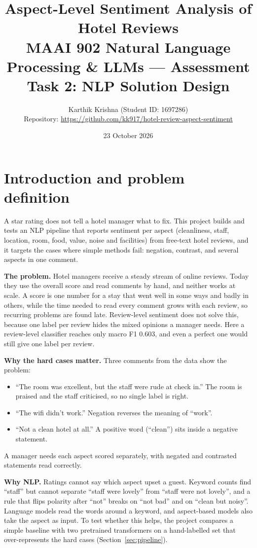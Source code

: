 \documentclass[11pt,a4paper]{article}
\title{Aspect-Level Sentiment Analysis of Hotel Reviews\\[2pt]
\large MAAI 902 Natural Language Processing \& LLMs --- Assessment Task 2: NLP Solution Design}
\author{Karthik Krishna (Student ID: 1697286)\\
Repository: \url{https://github.com/kk917/hotel-review-aspect-sentiment}}
\date{23 October 2026}
\begin{document}
\maketitle

\section{Introduction and problem definition}

A star rating does not tell a hotel manager what to fix. This project builds and tests an NLP pipeline that reports sentiment per aspect (cleanliness, staff, location, room, food, value, noise and facilities) from free-text hotel reviews, and it targets the cases where simple methods fail: negation, contrast, and several aspects in one comment.

\textbf{The problem.} Hotel managers receive a steady stream of online reviews. Today they use the overall score and read comments by hand, and neither works at scale. A score is one number for a stay that went well in some ways and badly in others, while the time needed to read every comment grows with each review, so recurring problems are found late. Review-level sentiment does not solve this, because one label per review hides the mixed opinions a manager needs. Here a review-level classifier reaches only macro F1 0.603, and even a perfect one would still give one label per review.

\textbf{Why the hard cases matter.} Three comments from the data show the problem:
\begin{itemize}[nosep]
  \item ``The room was excellent, but the staff were rude at check in.'' The room is praised and the staff criticised, so no single label is right.
  \item ``The wifi didn't work.'' Negation reverses the meaning of ``work''.
  \item ``Not a clean hotel at all.'' A positive word (``clean'') sits inside a negative statement.
\end{itemize}
A manager needs each aspect scored separately, with negated and contrasted statements read correctly.

\textbf{Why NLP.} Ratings cannot say which aspect upset a guest. Keyword counts find ``staff'' but cannot separate ``staff were lovely'' from ``staff were not lovely'', and a rule that flips polarity after ``not'' breaks on ``not bad'' and on ``clean but noisy''. Language models read the words around a keyword, and aspect-based models also take the aspect as input. To test whether this helps, the project compares a simple baseline with two pretrained transformers on a hand-labelled set that over-represents the hard cases (Section~\ref{sec:pipeline}).
\end{document}
